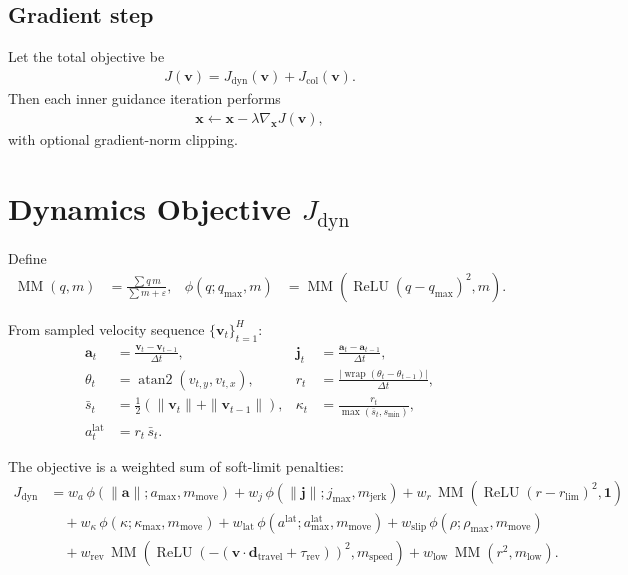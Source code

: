 \documentclass[11pt,a4paper]{article}
\begin{document}
\subsection{Gradient step}
Let the total objective be
\begin{align}
J(\bm{v}) = J_{\text{dyn}}(\bm{v}) + J_{\text{col}}(\bm{v}).
\end{align}
Then each inner guidance iteration performs
\begin{align}
\bm{x}\leftarrow \bm{x}-\lambda \nabla_{\bm{x}}J(\bm{v}),
\end{align}
with optional gradient-norm clipping.

\section{Dynamics Objective $J_{\text{dyn}}$}
Define
\begin{align}
\operatorname{MM}(q,m) &= \frac{\sum q\,m}{\sum m+\varepsilon},
&
\phi(q;q_{\max},m) &= \operatorname{MM}(\operatorname{ReLU}(q-q_{\max})^2,m).
\end{align}

From sampled velocity sequence $\{\bm{v}_t\}_{t=1}^{H}$:
\begin{align}
\bm{a}_t &= \frac{\bm{v}_t-\bm{v}_{t-1}}{\Delta t},
&
\bm{j}_t &= \frac{\bm{a}_t-\bm{a}_{t-1}}{\Delta t},
\\
\theta_t &= \operatorname{atan2}(v_{t,y},v_{t,x}),
&
r_t &= \frac{|\operatorname{wrap}(\theta_t-\theta_{t-1})|}{\Delta t},
\\
\bar{s}_t &= \tfrac{1}{2}(\|\bm{v}_t\|+\|\bm{v}_{t-1}\|),
&
\kappa_t &= \frac{r_t}{\max(\bar{s}_t,s_{\min})},
\\
a^{\text{lat}}_t &= r_t\,\bar{s}_t.
\end{align}

The objective is a weighted sum of soft-limit penalties:
\begin{align}
J_{\text{dyn}}
&=
w_a\,\phi(\|\bm{a}\|;a_{\max},m_{\text{move}})
+w_j\,\phi(\|\bm{j}\|;j_{\max},m_{\text{jerk}})
+w_r\,\operatorname{MM}(\operatorname{ReLU}(r-r_{\lim})^2,\mathbf{1})
\nonumber\\
&\quad
+w_\kappa\,\phi(\kappa;\kappa_{\max},m_{\text{move}})
+w_{\text{lat}}\,\phi(a^{\text{lat}};a^{\text{lat}}_{\max},m_{\text{move}})
+w_{\text{slip}}\,\phi(\rho;\rho_{\max},m_{\text{move}})
\nonumber\\
&\quad
+w_{\text{rev}}\,\operatorname{MM}\!\left(\operatorname{ReLU}(-( \bm{v}\!\cdot\!\bm{d}_{\text{travel}}+\tau_{\text{rev}}))^2,m_{\text{speed}}\right)
+w_{\text{low}}\,\operatorname{MM}(r^2,m_{\text{low}}).
\end{align}
\end{document}
